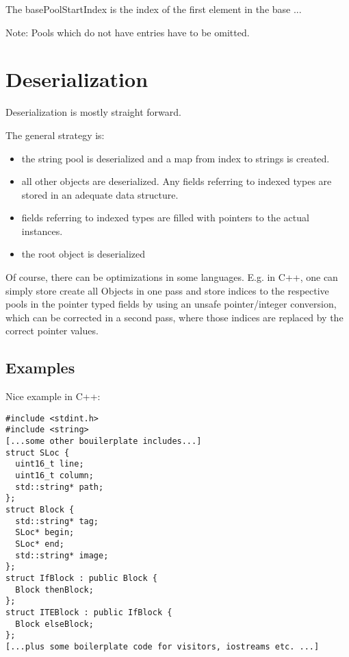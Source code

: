 \documentclass[a4paper,10pt]{article}
\begin{document}
The basePoolStartIndex is the index of the first element in the base ...


Note: Pools which do not have entries have to be omitted.

\section{Deserialization}

Deserialization is mostly straight forward.

The general strategy is:
\begin{itemize}
 \item the string pool is deserialized and a map from index to strings is created.
 \item all other objects are deserialized. Any fields referring to indexed types are stored in an adequate data structure.
 \item fields referring to indexed types are filled with pointers to the actual instances.
 \item the root object is deserialized
\end{itemize}

Of course, there can be optimizations in some languages. E.g. in C++, one can simply store create all Objects in one pass and store indices to the respective pools in the pointer typed fields by using an unsafe pointer/integer conversion, which can be corrected in a second pass, where those indices are replaced by the correct pointer values.


\subsection{Examples}

Nice example in C++:
\begin{verbatim}
#include <stdint.h>
#include <string>
[...some other bouilerplate includes...]
struct SLoc {
  uint16_t line;
  uint16_t column;
  std::string* path;
};
struct Block {
  std::string* tag;
  SLoc* begin;
  SLoc* end;
  std::string* image;
};
struct IfBlock : public Block {
  Block thenBlock;
};
struct ITEBlock : public IfBlock {
  Block elseBlock;
};
[...plus some boilerplate code for visitors, iostreams etc. ...]
\end{verbatim}
\end{document}
